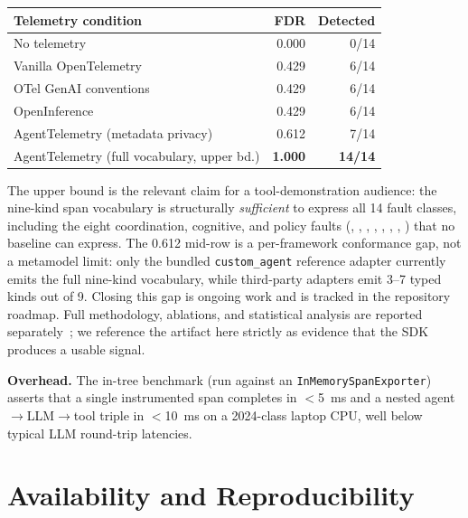 \documentclass[10pt,conference]{IEEEtran}
\begin{document}
\begin{center}\footnotesize
\setlength{\tabcolsep}{4pt}
\begin{tabular}{@{}l r r@{}}
\toprule
\textbf{Telemetry condition} & \textbf{FDR} & \textbf{Detected}\\
\midrule
No telemetry                                & 0.000 & 0/14\\
Vanilla OpenTelemetry                       & 0.429 & 6/14\\
OTel GenAI conventions                      & 0.429 & 6/14\\
OpenInference                               & 0.429 & 6/14\\
AgentTelemetry (metadata privacy)           & 0.612 & 7/14\\
AgentTelemetry (full vocabulary, upper bd.) & \textbf{1.000} & \textbf{14/14}\\
\bottomrule
\end{tabular}
\end{center}

The upper bound is the relevant claim for a tool-demonstration
audience: the nine-kind span vocabulary is structurally
\emph{sufficient} to express all 14 fault classes, including the
eight coordination, cognitive, and policy faults
(, ,
, ,
, ,
, ) that no
baseline can express. The 0.612 mid-row is a per-framework
conformance gap, not a metamodel limit: only the bundled
\texttt{custom\_agent} reference adapter currently emits the full
nine-kind vocabulary, while third-party adapters emit 3--7 typed
kinds out of 9. Closing this gap is ongoing work and is tracked in
the repository roadmap. Full methodology, ablations, and
statistical analysis are reported separately~\cite{agenttelemetry_aiware};
we reference the artifact here strictly as evidence that the SDK
produces a usable signal.

\textbf{Overhead.} The in-tree benchmark
 (run against an
\texttt{InMemorySpanExporter}) asserts that a single instrumented
span completes in $<$5~ms and a nested
agent$\to$LLM$\to$tool triple in $<$10~ms on a 2024-class laptop
CPU, well below typical LLM round-trip latencies.

\section{Availability and Reproducibility}
\label{sec:avail}
\end{document}
